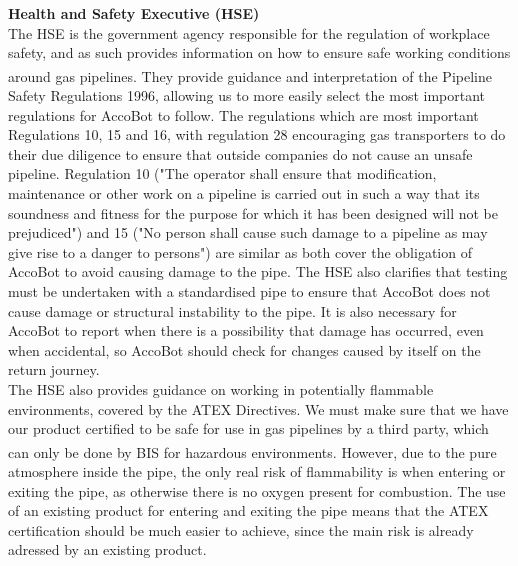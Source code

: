 \documentclass[11pt]{article}		%
\newcommand{\supercite}[1]{\textsuperscript{\cite{#1}}}		%
\begin{document}
			\textbf{Health and Safety Executive (HSE)}
			\\
			The HSE is the government agency responsible for the regulation of workplace safety, and as such provides information on how to ensure safe working conditions around gas pipelines.
			They provide guidance and interpretation\supercite{hse1996guide} of the Pipeline Safety Regulations 1996, allowing us to more easily select the most important regulations for AccoBot to follow.
			The regulations which are most important Regulations 10, 15 and 16, with regulation 28 encouraging gas transporters to do their due diligence to ensure that outside companies do not cause an unsafe pipeline.
			Regulation 10 ("The operator shall ensure that modification, maintenance or other work on a pipeline is carried out in such a way that its soundness and fitness for the purpose for which it has been designed will not be prejudiced") and 15 ("No person shall cause such damage to a pipeline as may give rise to a danger to persons") are similar as both cover the obligation of AccoBot to avoid causing damage to the pipe.
			The HSE also clarifies that testing must be undertaken with a standardised pipe to ensure that AccoBot does not cause damage or structural instability to the pipe.
			It is also necessary for AccoBot to report when there is a possibility that damage has occurred, even when accidental, so AccoBot should check for changes caused by itself on the return journey.
			\\
            \hspace*{3ex}The HSE also provides guidance on working in potentially flammable environments, covered by the ATEX Directives.
			We must make sure that we have our product certified to be safe for use in gas pipelines by a third party, which can only be done by BIS for hazardous environments\supercite{ATEX}.
			However, due to the pure atmosphere inside the pipe, the only real risk of flammability is when entering or exiting the pipe, as otherwise there is no oxygen present for combustion.
			The use of an existing product for entering and exiting the pipe means that the ATEX certification should be much easier to achieve, since the main risk is already adressed by an existing product.
			
\end{document}
